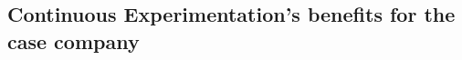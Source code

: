\documentclass[english, grading]{tktltiki2}
\theoremstyle{definition}
\theoremstyle{remark}
\begin{document}




\subsection{Continuous Experimentation's benefits for the case company}



\end{document}
